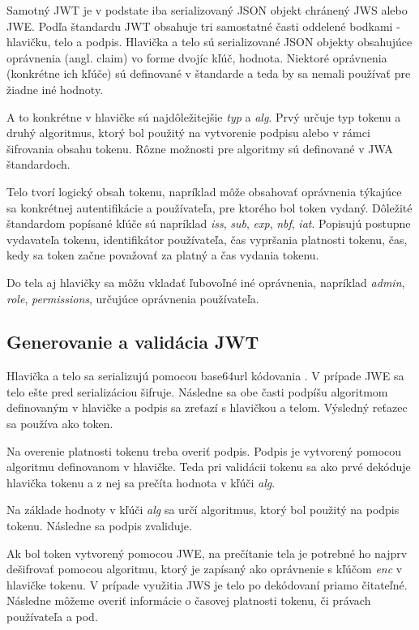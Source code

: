 Samotný JWT je v podstate iba serializovaný JSON objekt chránený JWS alebo JWE. Podľa štandardu JWT obsahuje tri samostatné časti oddelené bodkami - hlavičku, telo a podpis. Hlavička a telo sú serializované JSON objekty obsahujúce oprávnenia (angl. claim) vo forme dvojíc kľúč, hodnota. Niektoré oprávnenia (konkrétne ich kľúče) sú definované v štandarde a teda by sa nemali používať pre žiadne iné hodnoty. 

A to konkrétne v hlavičke sú najdôležitejšie \textit{typ} a \textit{alg}. Prvý určuje typ tokenu a druhý algoritmus, ktorý bol použitý na vytvorenie podpisu alebo v rámci šifrovania obsahu tokenu. Rôzne možnosti pre algoritmy sú definované v JWA štandardoch.

Telo tvorí logický obsah tokenu, napríklad môže obsahovať oprávnenia týkajúce sa konkrétnej autentifikácie a používateľa, pre ktorého bol token vydaný. Dôležité štandardom popísané kľúče sú napríklad \textit{iss}, \textit{sub}, \textit{exp}, \textit{nbf}, \textit{iat}. Popisujú postupne vydavateľa tokenu, identifikátor používateľa, čas vypršania platnosti tokenu, čas, kedy sa token začne považovať za platný a čas vydania tokenu.

Do tela aj hlavičky sa môžu vkladať ľubovoľné iné oprávnenia, napríklad \textit{admin}, \textit{role}, \textit{permissions}, určujúce oprávnenia používateľa.

\subsection{Generovanie a validácia JWT}

Hlavička a telo sa serializujú pomocou base64url kódovania \cite{base64_rfc}. V prípade JWE sa telo ešte pred serializáciou šifruje. Následne sa obe časti podpíšu algoritmom definovaným v hlavičke a podpis sa zreťazí s hlavičkou a telom. Výsledný reťazec sa používa ako token.

Na overenie platnosti tokenu treba overiť podpis. Podpis je vytvorený pomocou algoritmu definovanom v hlavičke. Teda pri validácii tokenu sa ako prvé dekóduje hlavička tokenu a z nej sa prečíta hodnota v kľúči \textit{alg}.

Na základe hodnoty v kľúči \textit{alg} sa určí algoritmus, ktorý bol použitý na podpis tokenu. Následne sa podpis zvaliduje. 

Ak bol token vytvorený pomocou JWE, na prečítanie tela je potrebné ho najprv dešifrovať pomocou algoritmu, ktorý je zapísaný ako oprávnenie s kľúčom \textit{enc} v hlavičke tokenu. V prípade využitia JWS je telo po dekódovaní priamo čitateľné. Následne môžeme overiť informácie o časovej platnosti tokenu, či právach používateľa a pod.

